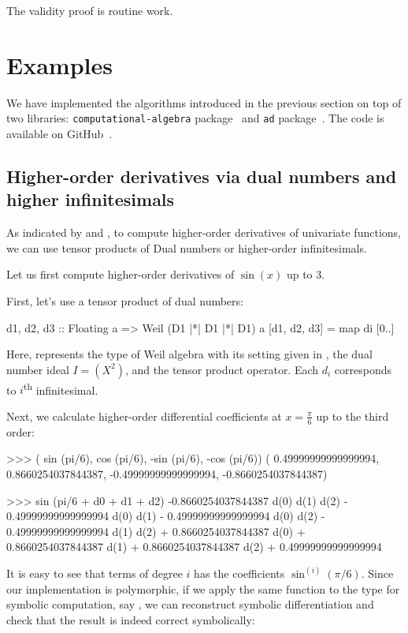 \documentclass[runningheads]{llncs}
\begin{document}
The validity proof is routine work.

\section{Examples}\label{sec:examples}
We have implemented the algorithms introduced in the previous section on top of two libraries: \texttt{computational-algebra} package~\cite{ISHII:2018ek,computational-algebra} and \texttt{ad} package~\cite{Kmett:2010aa}.
The code is available on GitHub~\cite{Ishii:2020aa}.

\subsection{Higher-order derivatives via dual numbers and higher infinitesimals}
As indicated by  and ,
to compute higher-order derivatives of univariate functions, we can use tensor products of Dual numbers or higher-order infinitesimals.

Let us first compute higher-order derivatives of $\sin(x)$ up to $3$.

First, let's use a tensor product of dual numbers:
\begin{code}
d1, d2, d3
  :: Floating a
  => Weil (D1 |*| D1 |*| D1) a
[d1, d2, d3] = map di [0..]
\end{code}

Here,  represents the type of Weil algebra with its setting given in ,  the dual number ideal $I = (X^2)$, and \hask{|*|} the tensor product operator.
Each $d_i$ corresponds to $i$\textsuperscript{th} infinitesimal.

Next, we calculate higher-order differential coefficients at $x = \frac{\pi}{6}$ up to the third order:

\begin{code}
>>> ( sin (pi/6),  cos (pi/6), 
     -sin (pi/6), -cos (pi/6))
( 0.49999999999999994,
  0.8660254037844387,
 -0.49999999999999994,
 -0.8660254037844387)

>>> sin (pi/6 + d0 + d1 + d2)
-0.8660254037844387 d(0) d(1) d(2) 
  - 0.49999999999999994 d(0) d(1) 
  - 0.49999999999999994 d(0) d(2)
  - 0.49999999999999994 d(1) d(2) 
  + 0.8660254037844387 d(0) 
  + 0.8660254037844387 d(1) 
  + 0.8660254037844387 d(2) 
  + 0.49999999999999994
\end{code}

It is easy to see that terms of degree $i$ has the coefficients $\sin^{(i)}(\pi/6)$.
Since our implementation is polymorphic, if we apply the same function to the type for symbolic computation, say , we can reconstruct symbolic differentiation and check that the result is indeed correct symbolically:
\end{document}
